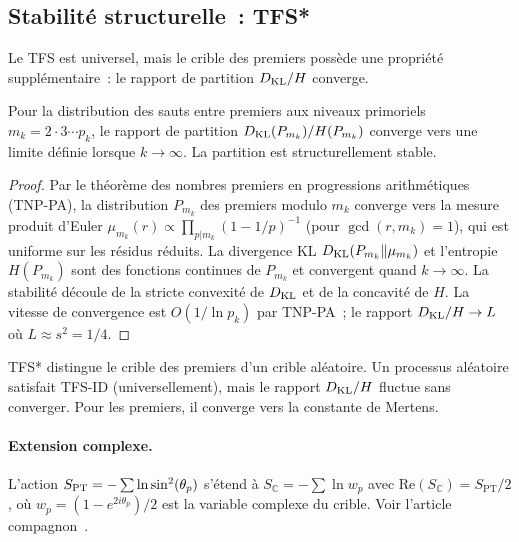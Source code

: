 \documentclass[12pt,a4paper]{article}
\begin{document}
\subsection{Stabilité structurelle~: TFS*}
\label{sec:gft_star}

Le TFS est universel, mais le crible des premiers possède une
propriété supplémentaire~: le rapport de partition $D_{\mathrm{KL}}/H$ converge.

\mDER
\begin{theoreme}
\label{thm:gft_star}
Pour la distribution des sauts entre premiers aux niveaux primoriels
$m_k = 2 \cdot 3 \cdots p_k$, le rapport de partition
$D_{\mathrm{KL}}(P_{m_k})/H(P_{m_k})$ converge vers une limite définie lorsque
$k \to \infty$. La partition est structurellement stable.

\begin{proof}
Par le théorème des nombres premiers en progressions arithmétiques
(TNP-PA), la distribution $P_{m_k}$ des premiers modulo $m_k$ converge
vers la mesure produit d'Euler
$\mu_{m_k}(r) \propto \prod_{p|m_k}(1-1/p)^{-1}$ (pour
$\gcd(r, m_k) = 1$), qui est uniforme sur les résidus réduits.
La divergence KL $D_{\mathrm{KL}}(P_{m_k}\|\mu_{m_k})$ et l'entropie $H(P_{m_k})$
sont des fonctions continues de $P_{m_k}$ et convergent quand
$k \to \infty$. La stabilité découle de la stricte convexité de
$D_{\mathrm{KL}}$ et de la concavité de $H$. La vitesse de convergence est
$O(1/\ln p_k)$ par TNP-PA~; le rapport $D_{\mathrm{KL}}/H \to L$ où
$L \approx s^2 = 1/4$.
\end{proof}
\end{theoreme}

\begin{remarque}
TFS* distingue le crible des premiers d'un crible aléatoire. Un
processus aléatoire satisfait TFS-ID (universellement), mais le
rapport $D_{\mathrm{KL}}/H$ fluctue sans converger. Pour les premiers, il
converge vers la constante de Mertens.
\end{remarque}

\paragraph{Extension complexe.}
L'action $S_{\mathrm{PT}} = -\sum\ln\sin^2(\theta_{p})$ s'étend à
$S_{\mathbb{C}} = -\sum\ln w_p$ avec
$\mathrm{Re}(S_{\mathbb{C}}) = S_{\mathrm{PT}}/2$, où
$w_p = (1 - e^{2i\theta_p})/2$ est la variable complexe du crible.
Voir l'article compagnon~\cite{companion_M4}.
\end{document}
